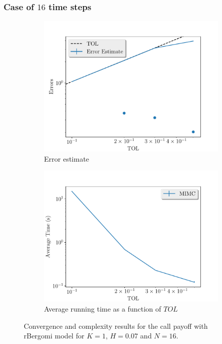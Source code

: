 \documentclass[11pt]{article}
\begin{document}
\subsubsection*{Case of $16$ time steps}
\begin{figure}[!h]
	\centering
	\begin{subfigure}{.4\textwidth}
		\centering
		\includegraphics[width=1\linewidth]{./figures/bergomi_misc/non_hierarchical/H_007/N_16/error_estimate.pdf}
		\caption{Error estimate}
		\label{fig:misc_rbergomi_8_steps_sub1}
	\end{subfigure}%
	\begin{subfigure}{.4\textwidth}
		\centering
		\includegraphics[width=1\linewidth]{./figures/bergomi_misc/non_hierarchical/H_007/N_16/average_running_time.pdf}
		\caption{Average running time as a function of $TOL$}
		\label{fig:misc_rbergomi_8_steps_sub2}
	\end{subfigure}%
	\caption{Convergence and complexity results for the call payoff with rBergomi model for $K=1$, $H=0.07$ and $N=16$.}
	\label{fig:misc_rbergomi_8_steps_1}
\end{figure}
\end{document}
